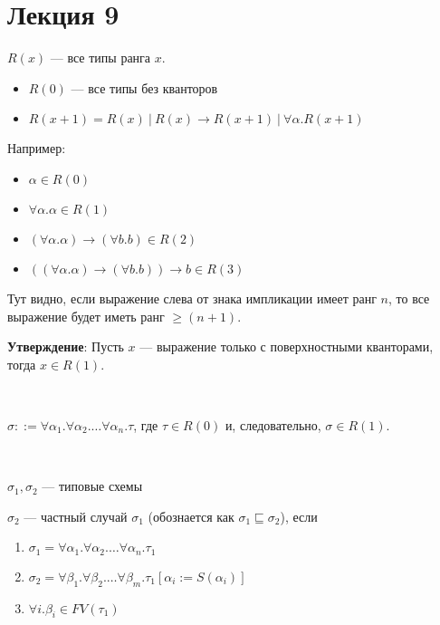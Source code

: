 \section{Лекция 9}

\begin{definition}
$R(x)$ --- все типы ранга $x$.
\begin{itemize}
    \item $R(0)$ --- все типы без кванторов
    \item $R(x + 1) = R(x)\ |\ R(x) \rightarrow R(x + 1)\ |\ \forall \alpha.R(x + 1)$
\end{itemize}
\end{definition}

Например:
\begin{paracol}{2}
\begin{itemize}
    \item $\alpha \in R(0)$
    \item $\forall \alpha.\alpha \in R(1)$
    \item $(\forall \alpha.\alpha) \rightarrow (\forall b.b) \in R(2)$ 
    \item $((\forall \alpha.\alpha) \rightarrow (\forall b.b)) \rightarrow b \in R(3)$
\end{itemize}
\switchcolumn
Тут видно, если выражение слева от знака импликации имеет ранг $n$, то все выражение будет иметь ранг $\geq (n + 1)$.
\end{paracol}

\textbf{Утверждение}: Пусть $x$ --- выражение только с поверхностными кванторами, тогда $x \in R(1)$. 

\begin{definition}\

$\sigma ::= \forall \alpha_1. \forall \alpha_2. \dots \forall \alpha_n. \tau$, где $\tau \in R(0)$ и, следовательно, $\sigma \in R(1)$.

\end{definition}

\begin{definition}\

$\sigma_1, \sigma_2$ --- типовые схемы

$\sigma_2$ --- частный случай $\sigma_1$ (обознается как $\sigma_1 \sqsubseteq \sigma_2$), если 

\begin{enumerate}
    \item $\sigma_1 =  \forall \alpha_1. \forall \alpha_2. \dots \forall \alpha_n. \tau_1$
    \item $\sigma_2 =  \forall \beta_1. \forall \beta_2. \dots \forall \beta_m. \tau_1[\alpha_i := S(\alpha_i)]$
    \item $\forall i. \beta_i \in FV(\tau_1)$
\end{enumerate}

\end{definition}

